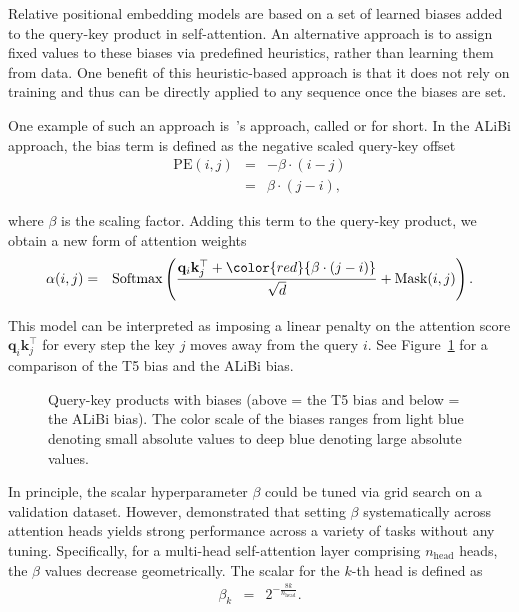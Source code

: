 \noindent Relative positional embedding models are based on a set of learned biases added to the query-key product in self-attention. An alternative approach is to assign fixed values to these biases via predefined heuristics, rather than learning them from data. One benefit of this heuristic-based approach is that it does not rely on training and thus can be directly applied to any sequence once the biases are set.

One example of such an approach is~\citet{press-etal:2022train}'s approach, called  or  for short. In the ALiBi approach, the bias term is defined as the negative scaled query-key offset
\begin{eqnarray}
\mathrm{PE}(i,j) & = & -\beta \cdot (i - j) \nonumber \\
                 & = & \beta \cdot (j - i) \label{eq:abili-bias},
\end{eqnarray}

\noindent where $\beta$ is the scaling factor. Adding this term to the query-key product, we obtain a new form of attention weights
\begin{eqnarray}
\alpha(i,j) & = & \mathrm{Softmax} \left(\frac{\mathbf{q}_i \mathbf{k}_{j}^\top + \color{red}{\beta \cdot (j - i)}}{\sqrt{d}} + \mathrm{Mask}(i,j) \right).
\end{eqnarray}

This model can be interpreted as imposing a linear penalty on the attention score $\mathbf{q}_i \mathbf{k}_{j}^\top$ for every step the key $j$ moves away from the query $i$. See Figure~\ref{fig:T5-and-ALiBi-biases} for a comparison of the T5 bias and the ALiBi bias.

\begin{figure}[!t]
\centering

\caption{Query-key products with biases (above = the T5 bias and below = the ALiBi bias). The color scale of the biases ranges from light blue denoting small absolute values to deep blue denoting large absolute values.}
\label{fig:T5-and-ALiBi-biases}
\end{figure}

In principle, the scalar hyperparameter $\beta$ could be tuned via grid search on a validation dataset. However, \citet{press-etal:2022train} demonstrated that setting $\beta$ systematically across attention heads yields strong performance across a variety of tasks without any tuning. Specifically, for a multi-head self-attention layer comprising $n_{\mathrm{head}}$ heads, the $\beta$ values decrease geometrically. The scalar for the $k$-th head is defined as
\begin{eqnarray}
\beta_k & = & 2^{-\frac{8k}{n_{\mathrm{head}}}}. \label{eq:alibi-beta}
\end{eqnarray}

